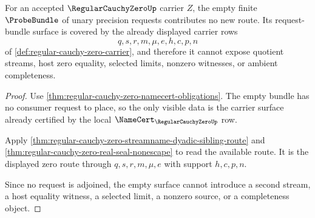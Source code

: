 \begin{theorem}
\label{thm:regular-cauchy-zero-probebundle-base-window}
For an accepted $\RegularCauchyZeroUp$ carrier $Z$, the empty finite $\ProbeBundle$ of unary precision requests contributes no new route. Its request-bundle surface is covered by the already displayed carrier rows
$$
q,s,r,m,\mu,e,h,c,p,n
$$
of \autoref{def:regular-cauchy-zero-carrier}, and therefore it cannot expose quotient streams, host zero equality, selected limits, nonzero witnesses, or ambient completeness.
\end{theorem}
\begin{proof}
Use \autoref{thm:regular-cauchy-zero-namecert-obligations}. The empty bundle has no consumer request to place, so the only visible data is the carrier surface already certified by the local $\NameCert_{\RegularCauchyZeroUp}$ row.

Apply \autoref{thm:regular-cauchy-zero-streamname-dyadic-sibling-route} and \autoref{thm:regular-cauchy-zero-real-seal-nonescape} to read the available route. It is the displayed zero route through $q,s,r,m,\mu,e$ with support $h,c,p,n$.

Since no request is adjoined, the empty surface cannot introduce a second stream, a host equality witness, a selected limit, a nonzero source, or a completeness object.
\end{proof}

